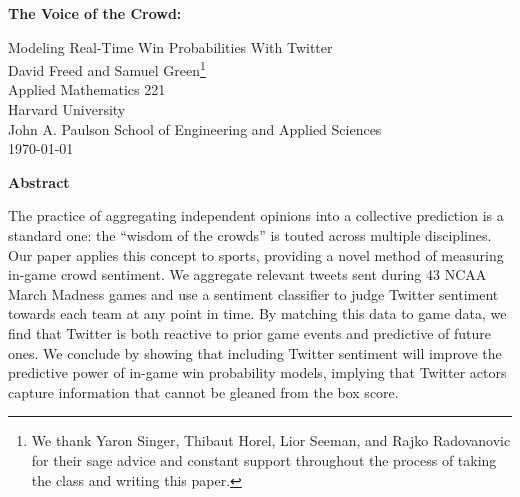 \documentclass[12pt]{article}
\begin{document}
\renewcommand*{\thefootnote}{\fnsymbol{footnote}}


\begin{titlepage}
\begin{doublespacing}
    \begin{center}
        \vspace*{4cm}
        \Large
        \textbf{The Voice of the Crowd:}
        
        \vspace{0.5cm}
        Modeling Real-Time Win Probabilities With Twitter\\
        \large
        \vspace{1cm}
        David Freed and Samuel Green\footnote{We thank Yaron Singer, Thibaut Horel, Lior Seeman, and Rajko Radovanovic for their sage advice and constant support throughout the process of taking the class and writing this paper.} \\ \vspace{0cm}
        Applied Mathematics 221 \\
        Harvard University \\
        John A. Paulson School of Engineering and Applied Sciences\\
        \today{} \\
       \end{center}
       
       \vspace{3cm}

\end{doublespacing}
\end{titlepage}

\renewcommand*{\thefootnote}{\arabic{footnote}}

\setcounter{page}{1}
\newpage

\begin{doublespacing}

\begin{center}
	\textbf{Abstract} \\
\end{center}
The practice of aggregating independent opinions into a collective prediction is a standard one: the ``wisdom of the crowds'' is touted across multiple disciplines. Our paper applies this concept to sports, providing a novel method of measuring in-game crowd sentiment. We aggregate relevant tweets sent during 43 NCAA March Madness games and use a sentiment classifier to judge Twitter sentiment towards each team at any point in time. By matching this data to game data, we find that Twitter is both reactive to prior game events and predictive of future ones. We conclude by showing that including Twitter sentiment will improve the predictive power of in-game win probability models, implying that Twitter actors capture information that cannot be gleaned from the box score. 

\end{doublespacing}
	    
\end{document}
